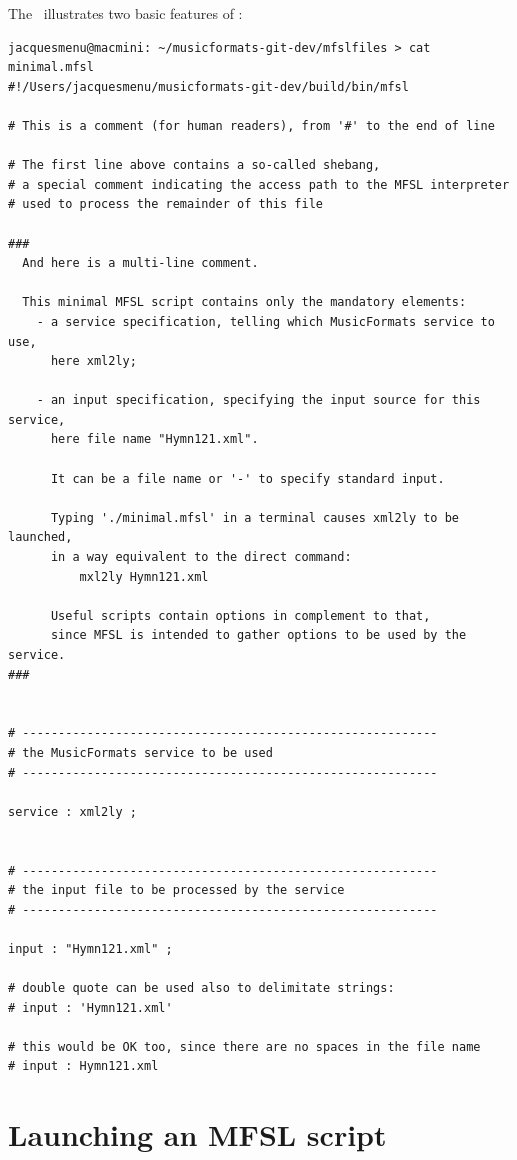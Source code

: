 The  \script\ illustrates two basic features of \mfslLang:
\begin{lstlisting}[language=MFSL]
jacquesmenu@macmini: ~/musicformats-git-dev/mfslfiles > cat minimal.mfsl
#!/Users/jacquesmenu/musicformats-git-dev/build/bin/mfsl

# This is a comment (for human readers), from '#' to the end of line

# The first line above contains a so-called shebang,
# a special comment indicating the access path to the MFSL interpreter
# used to process the remainder of this file

###
  And here is a multi-line comment.

  This minimal MFSL script contains only the mandatory elements:
    - a service specification, telling which MusicFormats service to use,
      here xml2ly;

    - an input specification, specifying the input source for this service,
      here file name "Hymn121.xml".

      It can be a file name or '-' to specify standard input.

      Typing './minimal.mfsl' in a terminal causes xml2ly to be launched,
      in a way equivalent to the direct command:
          mxl2ly Hymn121.xml

      Useful scripts contain options in complement to that,
      since MFSL is intended to gather options to be used by the service.
###


# ----------------------------------------------------------
# the MusicFormats service to be used
# ----------------------------------------------------------

service : xml2ly ;


# ----------------------------------------------------------
# the input file to be processed by the service
# ----------------------------------------------------------

input : "Hymn121.xml" ;

# double quote can be used also to delimitate strings:
# input : 'Hymn121.xml'

# this would be OK too, since there are no spaces in the file name
# input : Hymn121.xml
\end{lstlisting}


\section{Launching an MFSL script}

